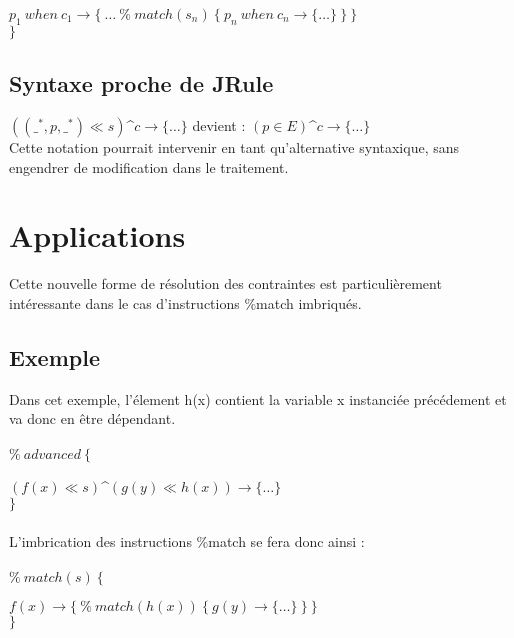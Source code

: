 \documentclass{article}
\newcommand{\filter}{\ll}
\begin{document}
$p_1\:when\:c_1\rightarrow\{\:\dots\:\%\:match(s_n)\:\{\:p_n\:when\:c_n\rightarrow\{\dots\}\:\}\:\}$
\\$\}$

\subsection{Syntaxe proche de JRule}
$((\_^*,p,\_^*)\filter s)$\textasciicircum$c\rightarrow\{\dots\}$ devient : $(p\in E)$\textasciicircum$c\rightarrow\{\dots\}$
\\

Cette notation pourrait intervenir en tant qu'alternative syntaxique, sans engendrer de modification dans le traitement.

\section{Applications}

Cette nouvelle forme de r\'esolution des contraintes est particuli\`erement in\-t\'e\-res\-sante dans le cas d'instructions \%match imbriqu\'es.

\subsection{Exemple}

Dans cet exemple, l'\'element h(x) contient la variable x instanci\'ee pr\'ec\'edement et va donc en \^etre d\'ependant.
\\\\
$\%\:advanced\:\{$

$(f(x)\filter s)$\textasciicircum$(g(y) \filter h(x))\rightarrow\{\dots\}$
\\$\}$
\\\\
L'imbrication des instructions \%match se fera donc ainsi :
\\\\
$\%\:match(s)\:\{$

$f(x)\rightarrow\{\:\%\:match(h(x))\:\{\:g(y)\rightarrow\{\dots\}\:\}\:\}$
\\$\}$
\end{document}
